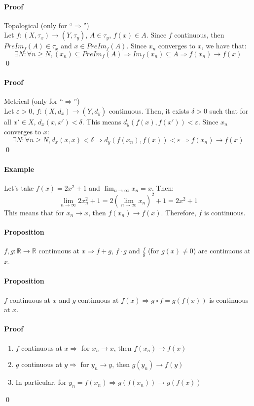 \documentclass{article}
\newcommand{\DS}{\displaystyle}
\newcommand{\func}[3]{#1 : #2 \rightarrow #3}
\newcommand{\funcR}[1]{#1 : \mathbb{R} \rightarrow \mathbb{R}}
\newcommand{\limn}{\lim_{n \to \infty}}
\newcommand{\Ep}{\varepsilon}
\newcommand{\Proposition}{\paragraph{Proposition}}
\newcommand{\Proof}{\paragraph{Proof}}
\newcommand{\Example}{\paragraph{Example}}
\begin{document}
  \Proof Topological (only for ``$\Rightarrow$'')
\\Let $\func{f}{(X,\tau_x)}{(Y,\tau_y)}$, $A \in \tau_y$, $f(x) \in A$. Since
  $f$ continuous, then $PreIm_f(A) \in \tau_x$ and $x \in PreIm_f(A)$. Since
  $x_n$ converges to $x$, we have that:
  \begin{equation*}
    \exists N : \forall n \geq N, (x_n) \subseteq PreIm_f(A) \Rightarrow
    Im_f(x_n) \subseteq A \Rightarrow f(x_n) \to f(x)
  \end{equation*}
  \qed

  \Proof Metrical (only for ``$\Rightarrow$'')
\\Let $\Ep > 0$, $\func{f}{(X,d_x)}{(Y,d_y)}$ continuous. Then, it exists
  $\delta > 0$ such that for all $x' \in X$, $d_x(x,x') < \delta$. This means
  $d_y(f(x),f(x')) < \Ep$. Since $x_n$ converges to $x$:
  \begin{equation*}
    \exists N : \forall n \geq N, d_x(x,x) < \delta \Rightarrow d_y(f(x_n),f(x))
    < \Ep \Rightarrow f(x_n) \to f(x)
  \end{equation*}
  \qed

  \Example Let's take $f(x) = 2x^2 + 1$ and $\DS \limn x_n = x$. Then:
  \begin{equation*}
    \limn 2x_n^2 + 1 = 2 \left(\limn x_n\right)^2 + 1 = 2x^2 + 1
  \end{equation*}
  This means that for $x_n \to x$, then $f(x_n) \to f(x)$. Therefore, $f$ is
  continuous.

  \Proposition $\funcR{f,g}$ continuous at $x \Rightarrow f+g$, $f \cdot g$ and
  $\frac{f}{g}$ (for $g(x) \neq 0$) are continuous at $x$.

  \Proposition $f$ continuous at $x$ and $g$ continuous at $f(x) \Rightarrow
  g \circ f = g(f(x))$ is continuous at $x$.

  \Proof
  \begin{enumerate}[label=(\arabic*)]
    \item $f$ continuous at $x \Rightarrow$ for $x_n \to x$, then $f(x_n) \to f(x)$
    \item $g$ continuous at $y \Rightarrow$ for $y_n \to y$, then $g(y_n) \to f(y)$
    \item In particular, for $y_n = f(x_n) \Rightarrow g(f(x_n)) \to g(f(x))$
  \end{enumerate}
  \qed
\end{document}
